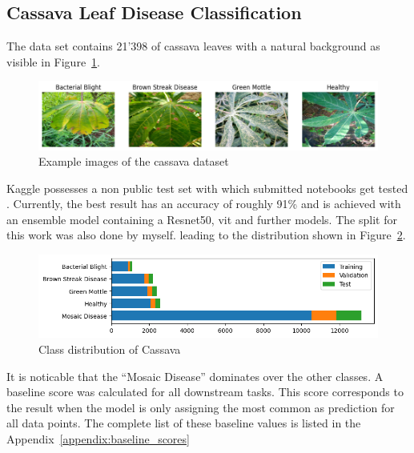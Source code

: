 \subsection{Cassava Leaf Disease Classification}
The data set contains 21'398 of cassava leaves with a natural background as visible in Figure~\ref{fig:example_images_of_cassava}.
\begin{figure}[H]
    \begin{center}
    \includegraphics[width=15cm]{../images/example_images_of_cassava.png}
    \caption{Example images of the cassava dataset}\label{fig:example_images_of_cassava}
    \end{center}
\end{figure}
Kaggle possesses a non public test set with which submitted notebooks get tested \autocite{mwebaze2020}. Currently, the best result has an accuracy of roughly 91\% and is achieved with an ensemble model containing a Resnet50, \gls{vit} and further models.  
The split for this work was also done by myself. leading to the distribution shown in Figure~\ref{fig:class_distribution_of_cassava}.
\begin{figure}[H]
    \begin{center}
    \includegraphics[width=15cm]{../images/class_distribution_of_cassava.png}
    \caption{Class distribution of Cassava}\label{fig:class_distribution_of_cassava}
    \end{center}
\end{figure}
It is noticable that the ``Mosaic Disease'' dominates over the other classes. A baseline score was calculated for all downstream tasks. This score corresponds to the result when the model is only assigning the most common as prediction for all data points. The complete list of these baseline values is listed in the Appendix~\ref{appendix:baseline_scores}

